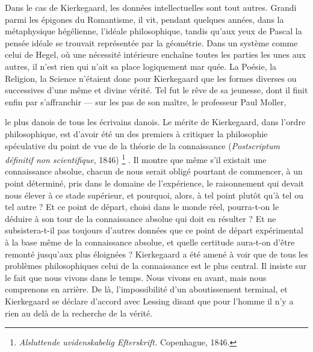 \documentclass[12pt,a4paper]{article}
\newcommand{\dk}[1]{\foreignlanguage{danish}{#1}}
\newcommand{\opage}[1]{\marginnote{\footnotesize\textit{[#1]}}}
\begin{document}
Dans le cas de Kierkegaard, les données intellectuelles sont tout
autres. Grandi parmi les épigones du Romantisme, il vit, pendant
quelques années, dans la métaphysique hégélienne, l'idéale philosophique,
tandis qu'aux yeux de Pascal la pensée idéale se trouvait
représentée par la géométrie. Dans un système comme celui de
Hegel, où une nécessité intérieure enchaîne toutes les parties les
unes aux autres, il n'est rien qui n'ait sa place logiquement mar\-%
quée. La Poésie, la Religion, la Science n'étaient donc pour Kierkegaard
que les formes diverses ou successives d'une même et
divine vérité. Tel fut le rêve de sa jeunesse, dont il finit enfin par
s'affranchir --- sur les pas de son maître, le professeur Paul Moller,%

le plus danois de tous les écrivains danois. Le mérite de Kierkegaard,
dans l'ordre philosophique, est d'avoir été un des premiers à
critiquer la philosophie spéculative du point de vue de la théorie
de la connaissance (\emph{Postscriptum définitif non scientifique}, 1846)%
\footnote{\dk{\emph{Alsluttende uvidenskabelig Efterskrift.}} Copenhague, 1846.}%
.
Il montre que même s'il existait une connaissance absolue, chacun
de nous serait obligé pourtant de commencer, à un point déterminé,
\opage{233} pris dans le domaine de l'expérience, le raisonnement qui devait
nous élever à ce stade supérieur, et pourquoi, alors, à tel point
plutôt qu'à tel ou tel autre ? Et ce point de départ, choisi dans le
monde réel, pourra-t-on le déduire à son tour de la connaissance
absolue qui doit en résulter ? Et ne subsistera-t-il pas toujours
d'autres données que ce point de départ expérimental à la base
même de la connaissance absolue, et quelle certitude aura-t-on
d'être remonté jusqu'aux plus éloignées ? Kierkegaard a été amené
à voir que de tous les problèmes philosophiques celui de la connaissance est le plus central. Il insiste sur le fait que nous vivons
dans le temps. Nous vivons en avant, mais nous comprenons en
arrière. De là, l'impossibilité d'un aboutissement terminal, et Kierkegaard
se déclare d'accord avec Lessing disant que pour l'homme
il n'y a rien au delà de la recherche de la vérité.
\end{document}

